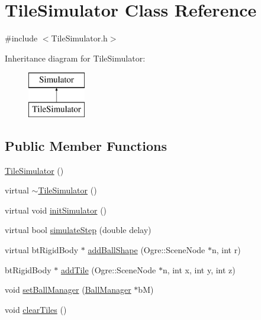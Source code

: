 \hypertarget{classTileSimulator}{\section{Tile\-Simulator Class Reference}
\label{classTileSimulator}
}


{\ttfamily \#include $<$Tile\-Simulator.\-h$>$}

Inheritance diagram for Tile\-Simulator\-:\begin{figure}[H]
\begin{center}
\leavevmode
\includegraphics[height=2.000000cm]{classTileSimulator}
\end{center}
\end{figure}
\subsection*{Public Member Functions}
\begin{DoxyCompactItemize}
\item 
\hyperlink{classTileSimulator_a96ab96c82b83362c9249c30afd9c8a73}{Tile\-Simulator} ()
\item 
virtual \hyperlink{classTileSimulator_ae888f7fa1ad73f5876edd70719e99e5c}{$\sim$\-Tile\-Simulator} ()
\item 
virtual void \hyperlink{classTileSimulator_a952f2493568e720f37331119084f9dd3}{init\-Simulator} ()
\item 
virtual bool \hyperlink{classTileSimulator_ae944141e1051b803018d6c4af47f2df9}{simulate\-Step} (double delay)
\item 
virtual bt\-Rigid\-Body $\ast$ \hyperlink{classTileSimulator_ad1db783060a2d2af92e614042cab0767}{add\-Ball\-Shape} (Ogre\-::\-Scene\-Node $\ast$n, int r)
\item 
bt\-Rigid\-Body $\ast$ \hyperlink{classTileSimulator_af5290bb6e13b9c9dccced4d275b7cac7}{add\-Tile} (Ogre\-::\-Scene\-Node $\ast$n, int x, int y, int z)
\item 
void \hyperlink{classTileSimulator_a6c90f655f570b9c80642007c6c97f1aa}{set\-Ball\-Manager} (\hyperlink{classBallManager}{Ball\-Manager} $\ast$b\-M)
\item 
void \hyperlink{classTileSimulator_a7a2fafd2bfe81f55fa760d4d02d55066}{clear\-Tiles} ()
\end{DoxyCompactItemize}
